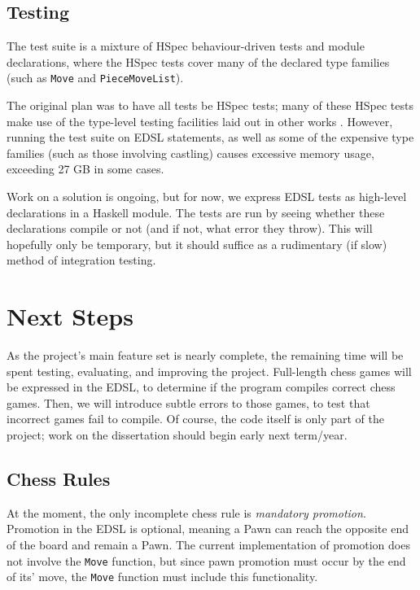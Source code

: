 \documentclass[12pt, a4paper, bibliography=totocnumbered]{scrartcl}
\begin{document}
\subsection{Testing}

The test suite is a mixture of HSpec behaviour-driven tests \cite{hspec} and module declarations, where the HSpec tests cover many of the declared type families (such as \lstinline{Move} and \lstinline{PieceMoveList}).

The original plan was to have all tests be HSpec tests; many of these HSpec tests make use of the type-level testing facilities laid out in other works \cite{mezzo}. However, running the test suite on EDSL statements, as well as some of the expensive type families (such as those involving castling) causes excessive memory usage, exceeding 27 GB in some cases.

Work on a solution is ongoing, but for now, we express EDSL tests as high-level declarations in a Haskell module. The tests are run by seeing whether these declarations compile or not (and if not, what error they throw). This will hopefully only be temporary, but it should suffice as a rudimentary (if slow) method of integration testing.

\section{Next Steps}

As the project's main feature set is nearly complete, the remaining time will be spent testing, evaluating, and improving the project. Full-length chess games will be expressed in the EDSL, to determine if the program compiles correct chess games. Then, we will introduce subtle errors to those games, to test that incorrect games fail to compile. Of course, the code itself is only part of the project; work on the dissertation should begin early next term/year.

\subsection{Chess Rules}

At the moment, the only incomplete chess rule is \emph{mandatory promotion}. Promotion in the EDSL is optional, meaning a Pawn can reach the opposite end of the board and remain a Pawn. The current implementation of promotion does not involve the \lstinline{Move} function, but since pawn promotion must occur by the end of its' move, the \lstinline{Move} function must include this functionality.
\end{document}
